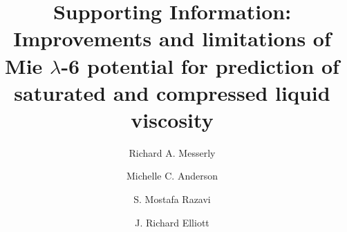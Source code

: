 \documentclass[preprint,review,12pt]{elsarticle}
\begin{document}
	
	\begin{frontmatter}
		
		
		
		\title{Supporting Information: Improvements and limitations of Mie $\lambda$-6 potential for prediction of saturated and compressed liquid viscosity}
		
		
		\author{Richard A. Messerly}
		\address{Thermodynamics Research Center, National Institute of Standards and Technology, Boulder, Colorado, 80305}
		
		\author{Michelle C. Anderson}
		\address{Thermodynamics Research Center, National Institute of Standards and Technology, Boulder, Colorado, 80305}
		
		\author{S. Mostafa Razavi}
		\address{Department of Chemical and Biomolecular Engineering, The University of Akron, Akron, Ohio, 44325-3906}
		
		\author{J. Richard Elliott}
		\address{Department of Chemical and Biomolecular Engineering, The University of Akron, Akron, Ohio, 44325-3906}
		

\end{frontmatter}
\end{document}

